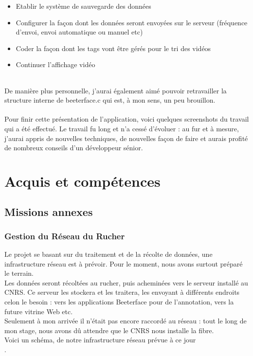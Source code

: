 \documentclass[11pt,french,a4paper]{report}
\begin{document}
\begin{itemize}
    \item Etablir le système de sauvegarde des données
    \item Configurer la façon dont les données seront envoyées sur le serveur (fréquence d'envoi, envoi automatique ou manuel etc) 
    \item Coder la façon dont les tags vont être  gérés pour le tri des vidéos 
    \item Continuer l'affichage vidéo
\end{itemize} 
\\
De manière plus personnelle, j'aurai également aimé pouvoir retravailler la structure interne de beeterface.c qui est, à mon sens,
un peu brouillon. \\
\\
Pour finir cette présentation de l'application, voici quelques screenshots du travail qui a été effectué.
Le travail fu long et n'a cessé d'évoluer : au fur et à mesure, j'aurai appris de nouvelles techniques, de nouvelles façon de faire 
et aurais profité de nombreux conseils d'un développeur sénior. \\


\chapter{Acquis et compétences}
    \section{Missions annexes}
        \subsection{Gestion du Réseau du Rucher}
Le projet se basant sur du traitement et de la récolte de données, une infrastructure réseau est à prévoir. Pour le moment,
nous avons surtout préparé le terrain.  \\
Les données seront récoltées au rucher, puis acheminées vers le serveur installé au CNRS. Ce serveur les stockera et les traitera, 
les envoyant à différents endroits celon le besoin : vers les applications Beeterface pour de l'annotation, vers la future vitrine Web
etc. \\
Seulement à mon arrivée il n'était pas encore raccordé au réseau : tout le long de mon stage,  nous avons dû attendre que
le CNRS nous installe la fibre. \\

Voici un schéma, de notre infrastructure réseau prévue à ce jour \\.
\end{document}
